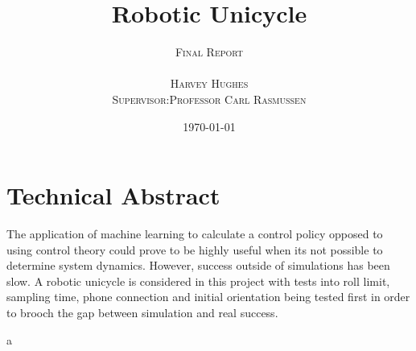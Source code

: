 \documentclass[twoside,twocolumn,12pt]{article}
\title{Robotic Unicycle} %
\author{%
\textsc{Final Report} \\
\\
\textsc{Harvey Hughes} \\
\textsc{Supervisor:Professor Carl Rasmussen} \\
}
\date{\today} %
\begin{document}
\maketitle


\section*{Technical Abstract}
The application of machine learning to calculate a control policy opposed to using control theory could prove to be highly useful when its not possible to determine system dynamics. However, success outside of simulations has been slow. A robotic unicycle is considered in this project with tests into roll limit, sampling time, phone connection and initial orientation being tested first in order to brooch the gap between simulation and real success.

\clearpage
a
\onecolumn

\tableofcontents

\twocolumn
\end{document}

